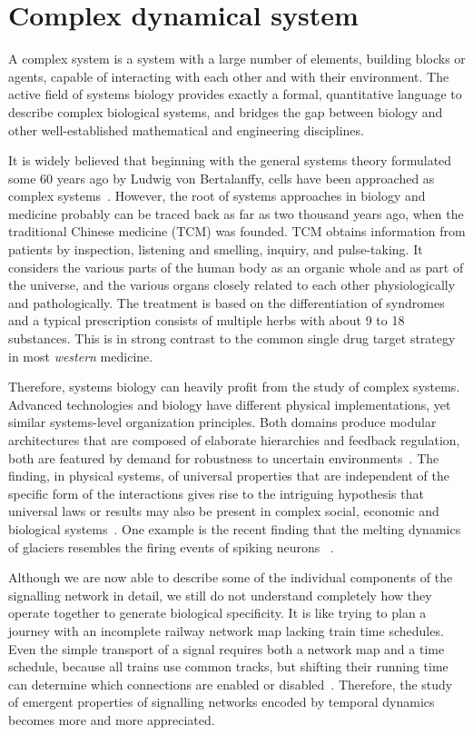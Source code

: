 \section{Complex dynamical system}
A complex system is a system with a large number of
elements, building blocks or agents, capable of interacting
with each other and with their environment.
The
active field of systems biology provides exactly a formal,
quantitative language to describe complex biological 
systems, and
bridges the gap between biology and other well-established
mathematical and engineering disciplines. 

It is widely believed that beginning with the general 
systems theory formulated some 
60 years ago by Ludwig von Bertalanffy, cells have been
approached as complex systems~\citep{Lazebnik2002a}. 
However, the root of systems approaches in biology and
medicine probably can be traced back as far as two 
thousand years
ago, when the traditional Chinese medicine (TCM) was 
founded. TCM obtains information from patients by 
inspection, 
listening and smelling, inquiry, and pulse-taking. 
It considers the various parts of the 
human body as an organic whole and as part of the 
universe, and the various organs closely 
related to each other physiologically and pathologically. 
The treatment is based on the 
differentiation of syndromes and a typical prescription
consists of multiple herbs with about 9 to 18 substances.
This is in strong contrast to the common single drug
target strategy in most \emph{western} medicine.

Therefore, systems biology can heavily profit from the
study of complex systems.
Advanced technologies and biology have different physical
implementations, yet similar systems-level organization
principles. Both domains produce modular architectures that are composed of elaborate hierarchies and feedback regulation, both are featured by demand for
robustness to uncertain environments~\citep{Csete2002}.
The
finding, in physical systems, of universal properties that
are independent of the specific form of the interactions
gives rise to the intriguing hypothesis that universal laws
or results may also be present in complex social, economic
and biological systems~\citep{Amaral2004}. One example is 
the recent finding that the melting dynamics of glaciers
resembles the firing events of spiking neurons~%
\citep{Chapuis2012}.

Although we are now able to describe some of the individual 
components of the 
signalling network in detail, we still do not understand completely how they operate together to generate biological specificity. It is like trying to plan a journey with an incomplete railway network map lacking train time schedules. Even the simple transport of a signal requires both a network map and a time schedule,
because all trains use common tracks, but shifting their 
running time can determine which connections are enabled or disabled~\citep{Kholodenko2010}.
Therefore, the study of emergent properties of signalling networks encoded by temporal dynamics becomes more and more
appreciated.

